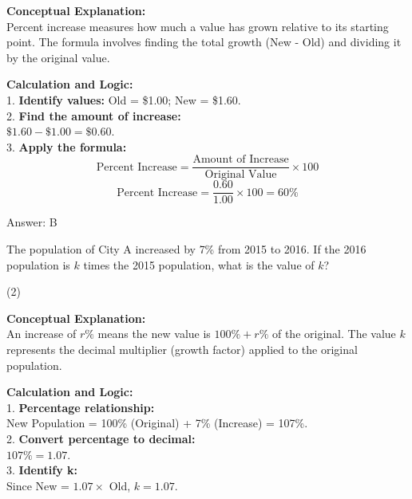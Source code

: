 \documentclass[11pt,paper=a4,answers]{exam}
\begin{document}
\begin{questions}
\begin{solution}
\textbf{Conceptual Explanation:} \\
Percent increase measures how much a value has grown relative to its starting point. The formula involves finding the total growth (New - Old) and dividing it by the original value.

\vspace{30pt}

\textbf{Calculation and Logic:} \\
1. \textbf{Identify values:} Old = \$1.00; New = \$1.60. \\
2. \textbf{Find the amount of increase:} \\
   $\$1.60 - \$1.00 = \$0.60$. \\
3. \textbf{Apply the formula:} \\
   \[ \text{Percent Increase} = \frac{\text{Amount of Increase}}{\text{Original Value}} \times 100 \]
   \[ \text{Percent Increase} = \frac{0.60}{1.00} \times 100 = 60\% \]

\vspace{30pt}

Answer: \colorbox{yellow!100}{B}
\end{solution}

\vspace{60pt}

\question
The population of City A increased by 7\% from 2015 to 2016. If the 2016 population is $k$ times the 2015 population, what is the value of $k$?
\begin{tasks}(2)
\end{tasks}

\begin{solution}
\textbf{Conceptual Explanation:} \\
An increase of $r\%$ means the new value is $100\% + r\%$ of the original. The value $k$ represents the decimal multiplier (growth factor) applied to the original population.

\vspace{30pt}

\textbf{Calculation and Logic:} \\
1. \textbf{Percentage relationship:} \\
   New Population = 100\% (Original) + 7\% (Increase) = 107\%. \\
2. \textbf{Convert percentage to decimal:} \\
   $107\% = 1.07$. \\
3. \textbf{Identify k:} \\
   Since New = $1.07 \times$ Old, $k = 1.07$.


\end{solution}
\end{questions}
\end{document}
